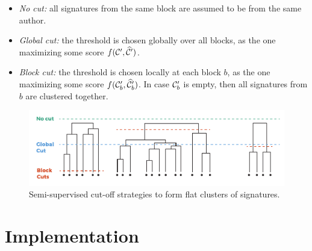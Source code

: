 \documentclass[runningheads,a4paper]{llncs}
\newcommand{\longpage}{\enlargethispage{\baselineskip}}
\begin{document}
\begin{itemize}

\item \textit{No cut:} all signatures from the same block are assumed to be from the same author.

\item \textit{Global cut:} the threshold is chosen globally over all blocks,
    as the one maximizing some score $f({\cal C}^\prime, \widehat{\cal C}^\prime)$.

\item \textit{Block cut:} the threshold is chosen locally at each block $b$,
    as the one maximizing some score $f({\cal C}_b^\prime, \widehat{\cal C}_b^\prime)$.
    In case ${\cal C}_b^\prime$ is empty, then all signatures from $b$ are clustered together.
\end{itemize}

\begin{figure}
\centering
\includegraphics[width=\textwidth]{fig-cuts.pdf}
\caption{Semi-supervised cut-off strategies to form flat clusters of signatures.}
\label{fig:cuts}
\end{figure}




\section{Implementation}
\label{implementation}

\longpage
\end{document}
